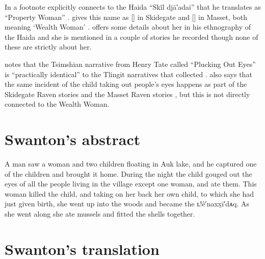 In a footnote \citeauthor{swanton:1909} explicitly connects  to the Haida “Skîl djā′adai” that he translates as “Property Woman” \parencite[292 fn.\ a]{swanton:1909}.
\citeauthor{enrico:2005} gives this name as  [] in Skidegate and  [] in Masset, both meaning ‘Wealth Woman’ \parencite[525]{enrico:2005}.
\citeauthor{swanton:1905a} offers some details about her in his ethnography of the Haida \parencite[29]{swanton:1905a} and she is mentioned in a couple of stories he recorded \parencites{swanton:1905b}{swanton:1908a} though none of these are strictly about her.

\citeauthor{boas:1916} notes that the Tsimshian narrative from Henry Tate called “Plucking Out Eyes” \parencite[154–158]{boas:1916} is “practically identical” to the Tlingit narratives that \citeauthor{swanton:1909} collected \parencite[746]{boas:1916}.
\citeauthor{boas:1916} also says that the same incident of the child taking out people’s eyes happens as part of the Skidegate Raven stories \parencite[111]{swanton:1905b} and the Masset Raven stories \parencite[143]{swanton:1905b}, but this is not directly connected to the Wealth Woman.

\section{Swanton’s abstract}\label{sec:94-swanton-abstract}

A man saw a woman and two children floating in Auk lake, and he captured one of the children and brought it home.
During the night the child gouged out the eyes of all the people living in the village except one woman, and ate them.
This woman killed the child, and taking on her back her own child, to which she had just given birth, she went up into the woods and became the ʟ!ê′naxx̣ī′dᴀq.
As she went along she ate mussels and fitted the shells together.

\section{Swanton’s translation}\label{sec:94-swanton-translation}

